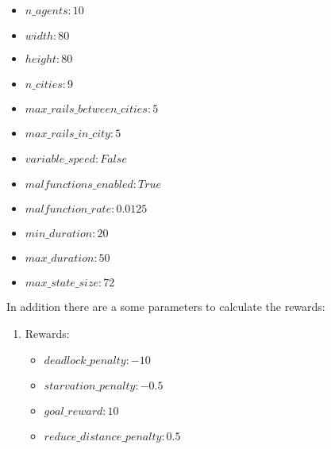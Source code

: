 \begin{enumerate}
\begin{itemize}
		\item $n\_agents: 10 $
		\item $width: 80 $
		\item $height: 80 $
		\item $n\_cities: 9 $
		\item $max\_rails\_between\_cities: 5 $
		\item $max\_rails\_in\_city: 5 $
		\item  $variable\_speed: False $
		\item $malfunctions\_enabled: True $
		\item $malfunction\_rate: 0.0125 $
		\item $min\_duration: 20 $
		\item $max\_duration: 50 $
		\item $max\_state\_size: 72$
	\end{itemize}
\end{enumerate}
In addition there are a some parameters to calculate the rewards:
\begin{enumerate}
	\item Rewards:
	\begin{itemize}
		\item $deadlock\_penalty: -10$
		\item $starvation\_penalty: -0.5$
		\item $goal\_reward: 10$
		\item $reduce\_distance\_penalty: 0.5$
	\end{itemize}
\end{enumerate}
